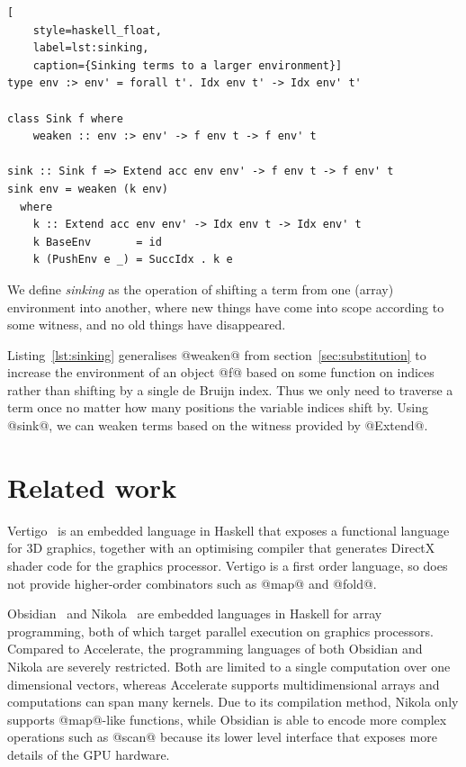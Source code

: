 \begin{lstlisting}[
    style=haskell_float,
    label=lst:sinking,
    caption={Sinking terms to a larger environment}]
type env :> env' = forall t'. Idx env t' -> Idx env' t'

class Sink f where
    weaken :: env :> env' -> f env t -> f env' t

sink :: Sink f => Extend acc env env' -> f env t -> f env' t
sink env = weaken (k env)
  where
    k :: Extend acc env env' -> Idx env t -> Idx env' t
    k BaseEnv       = id
    k (PushEnv e _) = SuccIdx . k e
\end{lstlisting}

We define \emph{sinking} as the operation of shifting a term from one (array)
environment into another, where new things have come into scope according to
some witness, and no old things have disappeared.

Listing~\ref{lst:sinking} generalises @weaken@ from
section~\ref{sec:substitution} to increase the environment of an object @f@
based on some function on indices rather than shifting by a single de Bruijn
index. Thus we only need to traverse a term once no matter how many positions
the variable indices shift by. Using @sink@, we can weaken terms based on the
witness provided by @Extend@.



\section{Related work}

Vertigo~\cite{Elliott:2004hh} is an embedded language in Haskell that exposes a
functional language for 3D graphics, together with an optimising compiler that
generates DirectX shader code for the graphics processor. Vertigo is a first
order language, so does not provide higher-order combinators such as @map@ and
@fold@.

Obsidian~\cite{Svensson:2008a} and Nikola~\cite{Mainland:2010vj} are embedded
languages in Haskell for array programming, both of which target parallel
execution on graphics processors. Compared to Accelerate, the programming
languages of both Obsidian and Nikola are severely restricted. Both are limited
to a single computation over one dimensional vectors, whereas Accelerate
supports multidimensional arrays and computations can span many kernels. Due to
its compilation method, Nikola only supports @map@-like functions, while
Obsidian is able to encode more complex operations such as @scan@ because its
lower level interface that exposes more details of the GPU hardware.


